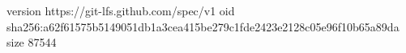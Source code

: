 version https://git-lfs.github.com/spec/v1
oid sha256:a62f61575b5149051db1a3cea415be279c1fde2423e2128c05e96f10b65a89da
size 87544
